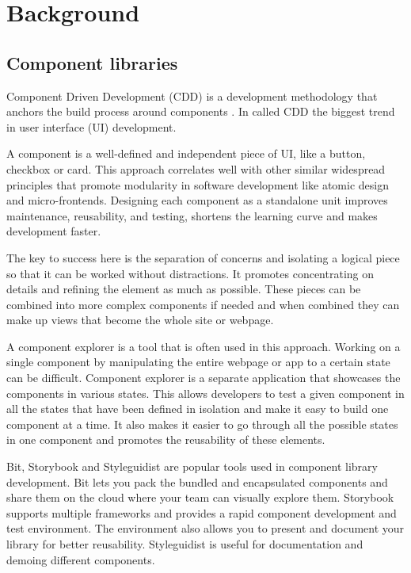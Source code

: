 \documentclass{master_thesis}
\begin{document}
\section{Background}



\subsection{Component libraries}

Component Driven Development (CDD) is a development methodology that anchors the build process around components \citep{Coleman2017}. In \citeyear{Coleman2017} \citeauthor{Coleman2017} called CDD the biggest trend in user interface (UI) development.

A component is a well-defined and independent piece of UI, like a button, checkbox or card. This approach correlates well with other similar widespread principles that promote modularity in software development like atomic design and micro-frontends. Designing each component as a standalone unit improves maintenance, reusability, and testing, shortens the learning curve and makes development faster. \citep{Ella2019}

The key to success here is the separation of concerns and isolating a logical piece so that it can be worked without distractions. It promotes concentrating on details and refining the element as much as possible. These pieces can be combined into more complex components if needed and when combined they can make up views that become the whole site or webpage.

A component explorer is a tool that is often used in this approach. Working on a single component by manipulating the entire webpage or app to a certain state can be difficult. Component explorer is a separate application that showcases the components in various states. This allows developers to test a given component in all the states that have been defined in isolation and make it easy to build one component at a time. It also makes it easier to go through all the possible states in one component and promotes the reusability of these elements. \citep{Coleman2017}

Bit, Storybook and Styleguidist are popular tools used in component library development. Bit lets you pack the bundled and encapsulated components and share them on the cloud where your team can visually explore them. Storybook supports multiple frameworks and provides a rapid component development and test environment. The environment also allows you to present and document your library for better reusability. Styleguidist is useful for documentation and demoing different components. \citep{Ella2019}
\end{document}
